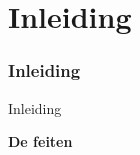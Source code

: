 %

\section{Inleiding}
\begin{frame}[fragile]
	\frametitle{Inleiding}

	\begin{center}\huge{Inleiding}\end{center}
	\begin{center}\huge{\color{typo3darkgrey}\textbf{De feiten}}\end{center}

\end{frame}

